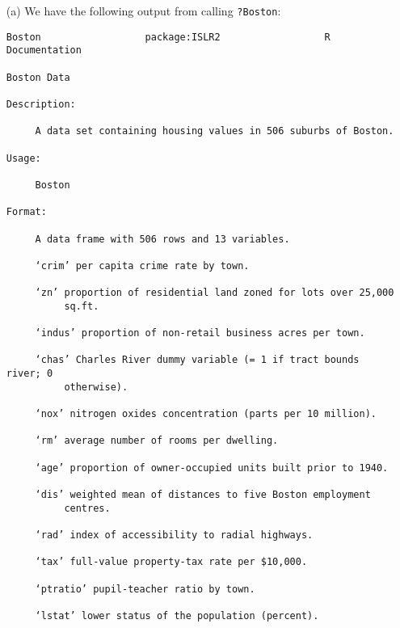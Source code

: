 
\begin{itemize}
    \item[(a)] We have the following output from calling \verb|?Boston|:
    \begin{verbatim}
Boston                  package:ISLR2                  R Documentation

Boston Data

Description:

     A data set containing housing values in 506 suburbs of Boston.

Usage:

     Boston

Format:

     A data frame with 506 rows and 13 variables.

     ‘crim’ per capita crime rate by town.

     ‘zn’ proportion of residential land zoned for lots over 25,000
          sq.ft.

     ‘indus’ proportion of non-retail business acres per town.

     ‘chas’ Charles River dummy variable (= 1 if tract bounds river; 0
          otherwise).

     ‘nox’ nitrogen oxides concentration (parts per 10 million).

     ‘rm’ average number of rooms per dwelling.

     ‘age’ proportion of owner-occupied units built prior to 1940.

     ‘dis’ weighted mean of distances to five Boston employment
          centres.

     ‘rad’ index of accessibility to radial highways.

     ‘tax’ full-value property-tax rate per $10,000.

     ‘ptratio’ pupil-teacher ratio by town.

     ‘lstat’ lower status of the population (percent).


\end{verbatim}
\end{itemize}
